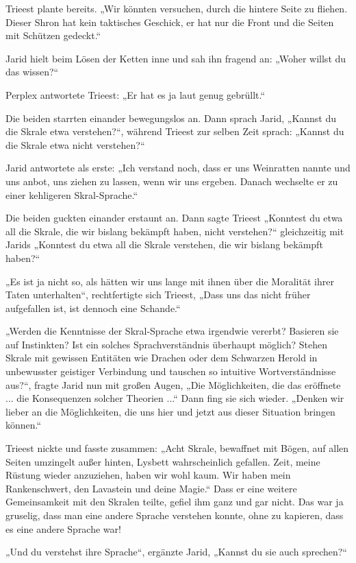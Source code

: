 Trieest plante bereits. „Wir könnten versuchen, durch die hintere Seite zu fliehen. Dieser Shron hat kein taktisches Geschick, er hat nur die Front und die Seiten mit Schützen gedeckt.“

Jarid hielt beim Lösen der Ketten inne und sah ihn fragend an: „Woher willst du das wissen?“

Perplex antwortete Trieest: „Er hat es ja laut genug gebrüllt.“

Die beiden starrten einander bewegungslos an. Dann sprach Jarid, „Kannst du die Skrale etwa verstehen?“, während Trieest zur selben Zeit sprach: „Kannst du die Skrale etwa nicht verstehen?“

Jarid antwortete als erste: „Ich verstand noch, dass er uns Weinratten nannte und uns anbot, uns ziehen zu lassen, wenn wir uns ergeben. Danach wechselte er zu einer kehligeren Skral-Sprache.“

Die beiden guckten einander erstaunt an. Dann sagte Trieest „Konntest du etwa all die Skrale, die wir bislang bekämpft haben, nicht verstehen?“ gleichzeitig mit Jarids „Konntest du etwa all die Skrale verstehen, die wir bislang bekämpft haben?“

„Es ist ja nicht so, als hätten wir uns lange mit ihnen über die Moralität ihrer Taten unterhalten“, rechtfertigte sich Trieest, „Dass uns das nicht früher aufgefallen ist, ist dennoch eine Schande.“

„Werden die Kenntnisse der Skral-Sprache etwa irgendwie vererbt? Basieren sie auf Instinkten? Ist ein solches Sprachverständnis überhaupt möglich? Stehen Skrale mit gewissen Entitäten wie Drachen oder dem Schwarzen Herold in unbewusster geistiger Verbindung und tauschen so intuitive Wortverständnisse aus?“, fragte Jarid nun mit großen Augen, „Die Möglichkeiten, die das eröffnete ... die Konsequenzen solcher Theorien ...“ Dann fing sie sich wieder. „Denken wir lieber an die Möglichkeiten, die uns hier und jetzt aus dieser Situation bringen können.“

Trieest nickte und fasste zusammen: „Acht Skrale, bewaffnet mit Bögen, auf allen Seiten umzingelt außer hinten, Lysbett wahrscheinlich gefallen. Zeit, meine Rüstung wieder anzuziehen, haben wir wohl kaum. Wir haben mein Rankenschwert, den Lavastein und deine Magie.“ Dass er eine weitere Gemeinsamkeit mit den Skralen teilte, gefiel ihm ganz und gar nicht. Das war ja gruselig, dass man eine andere Sprache verstehen konnte, ohne zu kapieren, dass es eine andere Sprache war!

„Und du verstehst ihre Sprache“, ergänzte Jarid, „Kannst du sie auch sprechen?“

